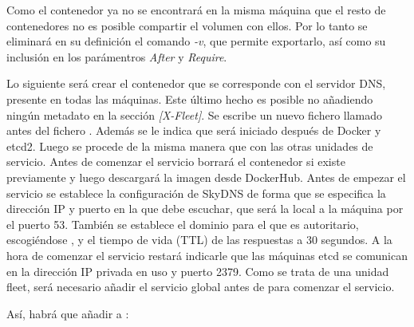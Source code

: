 Como el contenedor  ya no se encontrará en la misma máquina que el resto de contenedores no es posible compartir el volumen  con ellos. Por lo tanto se eliminará en su definición el comando \textit{-v}, que permite exportarlo, así como su inclusión en los parámentros \textit{After} y \textit{Require}.

Lo siguiente será crear el contenedor que se corresponde con el servidor DNS, presente en todas las máquinas. Este último hecho es posible no añadiendo ningún metadato en la sección \textit{[X-Fleet]}. Se escribe un nuevo fichero llamado  antes del fichero . Además se le indica que será iniciado después de Docker y etcd2. Luego se procede de la misma manera que con las otras unidades de servicio. Antes de comenzar el servicio borrará el contenedor si existe previamente y luego descargará la imagen desde DockerHub. Antes de empezar el servicio se establece la configuración de SkyDNS de forma que se especifica la dirección IP y puerto en la que debe escuchar, que será la local a la máquina por el puerto 53. También se establece el dominio para el que es autoritario, escogiéndose , y el tiempo de vida (TTL) de las respuestas a 30 segundos. A la hora de comenzar el servicio restará indicarle que las máquinas etcd se comunican en la dirección IP privada en uso y puerto 2379. Como se trata de una unidad fleet, será necesario añadir el servicio global  antes de  para comenzar el servicio. 

Así, habrá que añadir a :

\begin{codelisting}
\label{code:user-data-skydns}
\end{codelisting}

